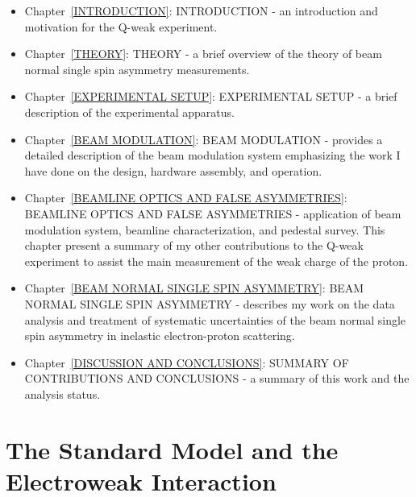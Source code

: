 \begin{itemize}
\doublespacing
\item Chapter~\ref{INTRODUCTION}: INTRODUCTION - an introduction and motivation for the Q-weak experiment.
\item Chapter~\ref{THEORY}: THEORY - a brief overview of the theory of beam normal single spin asymmetry measurements.
\item Chapter~\ref{EXPERIMENTAL SETUP}: EXPERIMENTAL SETUP - a brief description of the experimental apparatus.
\item Chapter~\ref{BEAM MODULATION}: BEAM MODULATION - provides a detailed description of the beam modulation system emphasizing the work I have done on the design, hardware assembly, and operation.
\item Chapter~\ref{BEAMLINE OPTICS AND FALSE ASYMMETRIES}: BEAMLINE OPTICS AND FALSE ASYMMETRIES - application of beam modulation system, beamline characterization, and pedestal survey. This chapter present a summary of my other contributions to the Q-weak experiment to assist the main measurement of the weak charge of the proton.
\item Chapter~\ref{BEAM NORMAL SINGLE SPIN ASYMMETRY}: BEAM NORMAL SINGLE SPIN ASYMMETRY - describes my work on the data analysis and treatment of systematic uncertainties of the beam normal single spin asymmetry in inelastic electron-proton scattering.
\item Chapter~\ref{DISCUSSION AND CONCLUSIONS}: SUMMARY OF CONTRIBUTIONS AND CONCLUSIONS - a summary of this work and the analysis status.
\end{itemize}

\section{The Standard Model and the Electroweak Interaction}
\label{The Standard Model and the Electroweak Interaction}

